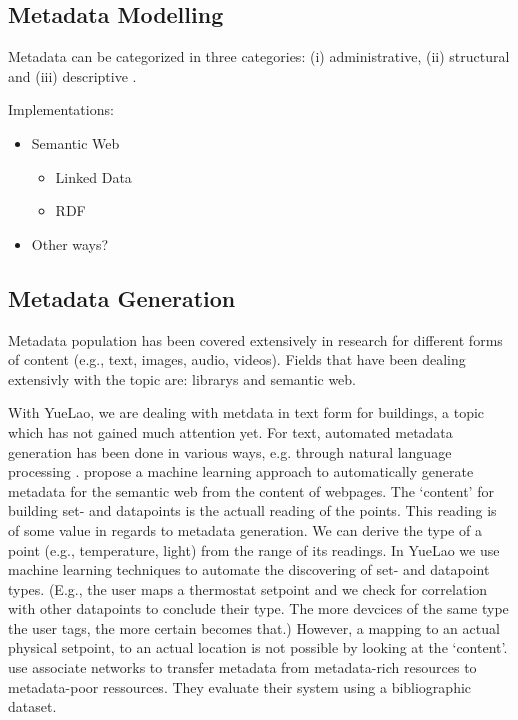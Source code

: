 \subsection{Metadata Modelling} %
\label{sub:metadata_modelling}

Metadata can be categorized in three categories: (i) administrative, (ii) structural and (iii) descriptive \cite{taylor2004organization}.

Implementations:

\begin{itemize}

  \item Semantic Web

  \begin{itemize}

    \item Linked Data
    \item RDF

  \end{itemize}
  
  \item Other ways?

\end{itemize}

\subsection{Metadata Generation} %
\label{sub:metadata_generation}
Metadata population has been covered extensively in research for different forms of content (e.g., text, images, audio, videos).
Fields that have been dealing extensivly with the topic are: librarys and semantic web.

With YueLao, we are dealing with metdata in text form for buildings, a topic which has not gained much attention yet.
For text, automated metadata generation has been done in various ways, e.g. through natural language processing \cite{Yang2005}.
\cite{Yang2005} propose a machine learning approach to automatically generate metadata for the semantic web from the content of webpages.
The `content' for building set- and datapoints is the actuall reading of the points.
This reading is of some value in regards to metadata generation. We can derive the type of a point (e.g., temperature, light) from the range of its readings. 
In YueLao we use machine learning techniques to automate the discovering of set- and datapoint types.
(E.g., the user maps a thermostat setpoint and we check for correlation with other datapoints to conclude their type. The more devcices of the same type the user tags, the more certain becomes that.)
However, a mapping to an actual physical setpoint, to an actual location is not possible by looking at the `content'.
\cite{Rodriguez2008} use associate networks to transfer metadata from metadata-rich resources to metadata-poor ressources. They evaluate their system using a bibliographic dataset. 


